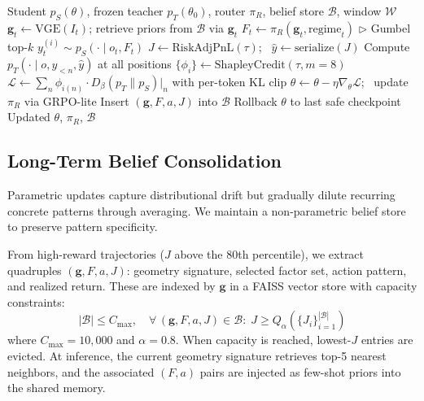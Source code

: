 \begin{algorithm}[t]
\caption{\textsc{FinOPD} Self-Evolution (One Iteration)}
\label{alg:finopd}
\begin{algorithmic}[1]
\REQUIRE Student $p_S(\theta)$, frozen teacher $p_T(\theta_0)$, router $\pi_R$, belief store $\mathcal{B}$, window $\mathcal{W}$
\STATE $\mathbf{g}_t \leftarrow \mathrm{VGE}(I_t)$; retrieve priors from $\mathcal{B}$ via $\mathbf{g}_t$
\STATE $F_t \leftarrow \pi_R(\mathbf{g}_t, \mathrm{regime}_t)$ \hfill $\triangleright$ Gumbel top-$k$
\STATE $y^{(i)}_t \sim p_S(\cdot \mid o_t, F_t)$
\ENDFOR
\ENDFOR
\STATE $J \leftarrow \mathrm{RiskAdjPnL}(\tau)$; \ $\hat{y} \leftarrow \mathrm{serialize}(J)$
\STATE Compute $p_T(\cdot \mid o, y_{<n}, \hat{y})$ at all positions
\STATE $\{\phi_i\} \leftarrow \mathrm{ShapleyCredit}(\tau, m{=}8)$
\STATE $\mathcal{L} \leftarrow \sum_n \phi_{i(n)} \cdot D_\beta(p_T \| p_S)|_n$ with per-token KL clip
\STATE $\theta \leftarrow \theta - \eta \nabla_\theta \mathcal{L}$; \ update $\pi_R$ via GRPO-lite
\STATE Insert $(\mathbf{g}, F, a, J)$ into $\mathcal{B}$
\ENDIF
{}
\STATE Rollback $\theta$ to last safe checkpoint
\ENDIF
\RETURN Updated $\theta$, $\pi_R$, $\mathcal{B}$
\end{algorithmic}
\end{algorithm}

\subsection{Long-Term Belief Consolidation}
\label{sec:belief}

Parametric updates capture distributional drift but gradually dilute recurring concrete patterns through averaging. We maintain a non-parametric belief store to preserve pattern specificity.

From high-reward trajectories ($J$ above the 80th percentile), we extract quadruples $(\mathbf{g}, F, a, J)$: geometry signature, selected factor set, action pattern, and realized return. These are indexed by $\mathbf{g}$ in a FAISS vector store with capacity constraints:
\begin{equation}
|\mathcal{B}| \leq C_{\max}, \quad \forall\, (\mathbf{g}, F, a, J) \in \mathcal{B}: \; J \geq Q_{\alpha}(\{J_i\}_{i=1}^{|\mathcal{B}|})
\end{equation}
where $C_{\max} = 10{,}000$ and $\alpha = 0.8$. When capacity is reached, lowest-$J$ entries are evicted. At inference, the current geometry signature retrieves top-5 nearest neighbors, and the associated $(F, a)$ pairs are injected as few-shot priors into the shared memory.

